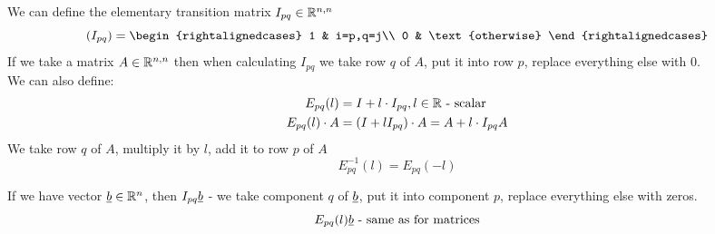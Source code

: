 \begin{definition}
We can define the elementary transition matrix $I_{pq}\in\mathbb{R}^{n,n}$
\[
\left( I_{pq}\right) = \begin{rightalignedcases}
1 & i=p,q=j\\
0 & \text{otherwise}
\end{rightalignedcases}
\]
If we take a matrix $A\in\mathbb{R}^{n,n}$ then when calculating $I_{pq}$ we take row $q$ of $A$, put it into row $p$, replace everything else with 0.\\

We can also define:
\begin{align*}
E_{pq}(l) &= I + l\cdot I_{pq}, l\in\mathbb{R}\text{ - scalar}\\
E_{pq}(l)\cdot A &= (I+lI_{pq})\cdot A = A + l\cdot I_{pq}A
\end{align*}
We take row $q$ of $A$, multiply it by $l$, add it to row $p$ of $A$
\[
E^{-1}_{pq}(l) = E_{pq}(-l)
\]
\end{definition}
If we have vector $\underline{b}\in\mathbb{R}^n$, then $I_{pq}\underline{b}$ - we take component $q$ of $\underline{b}$, put it into component $p$, replace everything else with zeros. 
\[
E_{pq}(l)\underline{b}\text{ - same as for matrices}
\]


